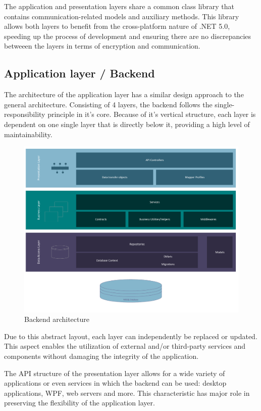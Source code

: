 The application and presentation layers share a common class library that contains communication-related models and auxiliary methods.
This library allows both layers to benefit from the cross-platform nature of .NET 5.0, speeding up the process of development and
ensuring there are no discrepancies betweeen the layers in terms of encryption and communication.

\subsection{Application layer / Backend}

The architecture of the application layer has a similar design approach to the general architecture.
Consisting of 4 layers, the backend follows the single-responsibility principle in it's core.
Because of it's vertical structure, each layer is dependent on one single layer that is directly below it, providing a high level
of maintainability.

\begin{figure}[H]
	\centering
	\includegraphics[scale=0.57]{backend-architecture}
	\caption{Backend architecture}
\end{figure}

Due to this abstract layout, each layer can independently be replaced or updated. 
This aspect enables the utilization of external and/or third-party services and components without damaging the integrity of the application.

The API structure of the presentation layer allows for a wide variety of applications or even services in which the backend can be used: desktop applications,
WPF, web servers and more. This characteristic has major role in preserving the flexibility of the application layer.

